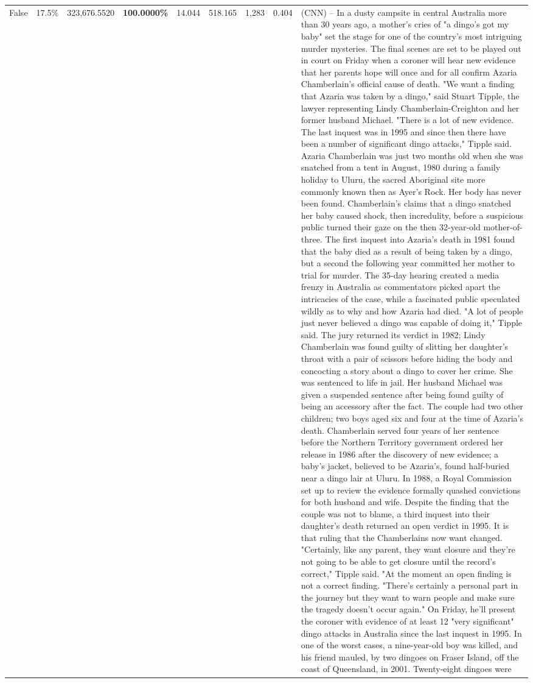 \begin{table}[H]
\begin{tabular}{lllrlllll}
False & 17.5\% & 323,676.5520 & \bfseries \color{red} 100.0000\% & 14.044 & 518.165 & 1,283 & 0.404 & (CNN) -- In a dusty campsite in central Australia more than 30 years ago, a mother's cries of "a dingo's got my baby" set the stage for one of the country's most intriguing murder mysteries. The final scenes are set to be played out in court on Friday when a coroner will hear new evidence that her parents hope will once and for all confirm Azaria Chamberlain's official cause of death. "We want a finding that Azaria was taken by a dingo," said Stuart Tipple, the lawyer representing Lindy Chamberlain-Creighton and her former husband Michael. "There is a lot of new evidence. The last inquest was in 1995 and since then there have been a number of significant dingo attacks," Tipple said. Azaria Chamberlain was just two months old when she was snatched from a tent in August, 1980 during a family holiday to Uluru, the sacred Aboriginal site more commonly known then as Ayer's Rock. Her body has never been found. Chamberlain's claims that a dingo snatched her baby caused shock, then incredulity, before a suspicious public turned their gaze on the then 32-year-old mother-of-three. The first inquest into Azaria's death in 1981 found that the baby died as a result of being taken by a dingo, but a second the following year committed her mother to trial for murder. The 35-day hearing created a media frenzy in Australia as commentators picked apart the intricacies of the case, while a fascinated public speculated wildly as to why and how Azaria had died. "A lot of people just never believed a dingo was capable of doing it," Tipple said. The jury returned its verdict in 1982; Lindy Chamberlain was found guilty of slitting her daughter's throat with a pair of scissors before hiding the body and concocting a story about a dingo to cover her crime. She was sentenced to life in jail. Her husband Michael was given a suspended sentence after being found guilty of being an accessory after the fact. The couple had two other children; two boys aged six and four at the time of Azaria's death. Chamberlain served four years of her sentence before the Northern Territory government ordered her release in 1986 after the discovery of new evidence; a baby's jacket, believed to be Azaria's, found half-buried near a dingo lair at Uluru. In 1988, a Royal Commission set up to review the evidence formally quashed convictions for both husband and wife. Despite the finding that the couple was not to blame, a third inquest into their daughter's death returned an open verdict in 1995. It is that ruling that the Chamberlains now want changed. "Certainly, like any parent, they want closure and they're not going to be able to get closure until the record's correct," Tipple said. "At the moment an open finding is not a correct finding. "There's certainly a personal part in the journey but they want to warn people and make sure the tragedy doesn't occur again." On Friday, he'll present the coroner with evidence of at least 12 "very significant" dingo attacks in Australia since the last inquest in 1995. In one of the worst cases, a nine-year-old boy was killed, and his friend mauled, by two dingoes on Fraser Island, off the coast of Queensland, in 2001. Twenty-eight dingoes were 
\end{tabular}
\end{table}

